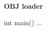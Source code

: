 \documentclass[a4paper]{article}
\begin{document}
\begin{center}
   \large \textbf{OBJ loader}
\end{center}

\vskip 1cm





\begin{cpp}
int main() ...
\end{cpp}
\end{document}
